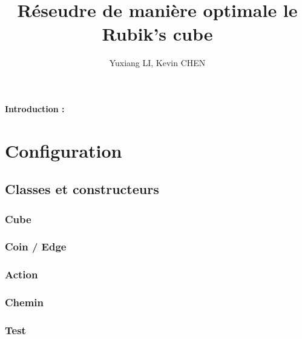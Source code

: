\documentclass{article}
\title{Réseudre de manière optimale le Rubik’s cube}
\author{Yuxiang LI, Kevin CHEN}
\begin{document}
 
\maketitle 

\paragraph{Introduction : }
\section{Configuration}
\paragraph{}
\subsection{Classes et constructeurs} 
\paragraph{}
\subsubsection{Cube} 
\paragraph{}
\subsubsection{Coin / Edge} 
\paragraph{}
\subsubsection{Action}
\paragraph{} 
\subsubsection{Chemin}
\paragraph{}
\subsubsection{Test}
\end{document}
